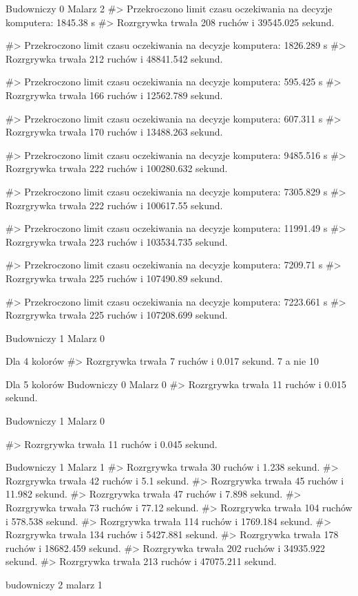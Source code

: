\documentclass[document]{xmgr}
\begin{document}
Budowniczy 0
Malarz 2
#> Przekroczono limit czasu oczekiwania na decyzje komputera: 1845.38 s
#> Rozrgrywka trwała 208 ruchów i 39545.025 sekund.

#> Przekroczono limit czasu oczekiwania na decyzje komputera: 1826.289 s
#> Rozrgrywka trwała 212 ruchów i 48841.542 sekund.

#> Przekroczono limit czasu oczekiwania na decyzje komputera: 595.425 s
#> Rozrgrywka trwała 166 ruchów i 12562.789 sekund.

#> Przekroczono limit czasu oczekiwania na decyzje komputera: 607.311 s
#> Rozrgrywka trwała 170 ruchów i 13488.263 sekund.


#> Przekroczono limit czasu oczekiwania na decyzje komputera: 9485.516 s
#> Rozrgrywka trwała 222 ruchów i 100280.632 sekund.

#> Przekroczono limit czasu oczekiwania na decyzje komputera: 7305.829 s
#> Rozrgrywka trwała 222 ruchów i 100617.55 sekund.

#> Przekroczono limit czasu oczekiwania na decyzje komputera: 11991.49 s
#> Rozrgrywka trwała 223 ruchów i 103534.735 sekund.

#> Przekroczono limit czasu oczekiwania na decyzje komputera: 7209.71 s
#> Rozrgrywka trwała 225 ruchów i 107490.89 sekund.

#> Przekroczono limit czasu oczekiwania na decyzje komputera: 7223.661 s
#> Rozrgrywka trwała 225 ruchów i 107208.699 sekund.


Budowniczy 1
Malarz 0

Dla 4 kolorów
#> Rozrgrywka trwała 7 ruchów i 0.017 sekund.
7 a nie 10


Dla 5 kolorów
Budowniczy 0
Malarz 0
#> Rozrgrywka trwała 11 ruchów i 0.015 sekund.

Budowniczy 1
Malarz 0

#> Rozrgrywka trwała 11 ruchów i 0.045 sekund.


Budowniczy 1
Malarz 1
#> Rozrgrywka trwała 30 ruchów i 1.238 sekund.
#> Rozrgrywka trwała 42 ruchów i 5.1 sekund.
#> Rozrgrywka trwała 45 ruchów i 11.982 sekund.
#> Rozrgrywka trwała 47 ruchów i 7.898 sekund.
#> Rozrgrywka trwała 73 ruchów i 77.12 sekund.
#> Rozrgrywka trwała 104 ruchów i 578.538 sekund.
#> Rozrgrywka trwała 114 ruchów i 1769.184 sekund.
#> Rozrgrywka trwała 134 ruchów i 5427.881 sekund.
#> Rozrgrywka trwała 178 ruchów i 18682.459 sekund.
#> Rozrgrywka trwała 202 ruchów i 34935.922 sekund.
#> Rozrgrywka trwała 213 ruchów i 47075.211 sekund.


budowniczy 2
malarz 1
\end{document}

